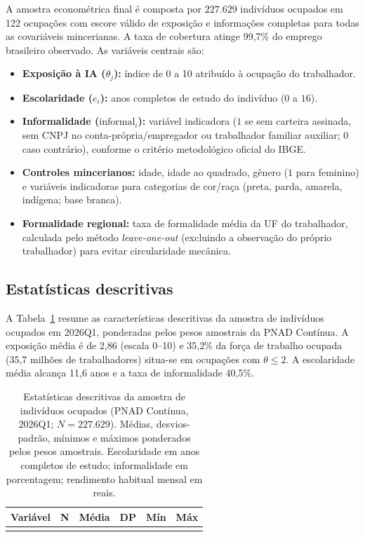 A amostra econométrica final é composta por $227.629$ indivíduos ocupados em 122 ocupações com escore válido de exposição e informações completas para todas as covariáveis mincerianas. A taxa de cobertura atinge 99{,}7\% do emprego brasileiro observado. As variáveis centrais são:
\begin{itemize}
    \item \textbf{Exposição à IA ($\theta_j$):} índice de 0 a 10 atribuído à ocupação do trabalhador.
    \item \textbf{Escolaridade ($e_i$):} anos completos de estudo do indivíduo ($0$ a $16$).
    \item \textbf{Informalidade ($\text{informal}_i$):} variável indicadora ($1$ se sem carteira assinada, sem CNPJ no conta-própria/empregador ou trabalhador familiar auxiliar; $0$ caso contrário), conforme o critério metodológico oficial do IBGE.
    \item \textbf{Controles mincerianos:} idade, idade ao quadrado, gênero ($1$ para feminino) e variáveis indicadoras para categorias de cor/raça (preta, parda, amarela, indígena; base branca).
    \item \textbf{Formalidade regional:} taxa de formalidade média da UF do trabalhador, calculada pelo método \emph{leave-one-out} (excluindo a observação do próprio trabalhador) para evitar circularidade mecânica.
\end{itemize}

\subsection{Estatísticas descritivas}

A Tabela~\ref{tab:descritivas} resume as características descritivas da amostra de indivíduos ocupados em 2026Q1, ponderadas pelos pesos amostrais da PNAD Contínua. A exposição média é de 2{,}86 (escala 0--10) e 35,2\% da força de trabalho ocupada (35{,}7 milhões de trabalhadores) situa-se em ocupações com $\theta \le 2$. A escolaridade média alcança 11,6 anos e a taxa de informalidade 40,5\%.

\begin{table}[htbp]
\centering
\caption{Estatísticas descritivas da amostra de indivíduos ocupados (PNAD Contínua, 2026Q1; $N = 227.629$). Médias, desvios-padrão, mínimos e máximos ponderados pelos pesos amostrais. Escolaridade em anos completos de estudo; informalidade em porcentagem; rendimento habitual mensal em reais.}
\label{tab:descritivas}
\begin{tabular}{lccccc}
\toprule
Variável & N & Média & DP & Mín & Máx \\
\midrule
 \\
\bottomrule
\end{tabular}
\end{table}

